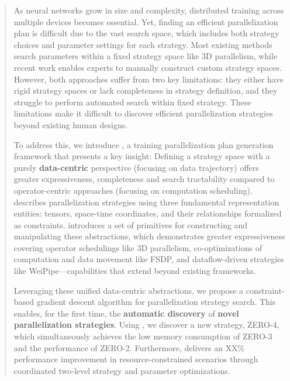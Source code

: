 \begin{abstract}
As neural networks grow in size and complexity, distributed training across multiple devices becomes essential. Yet, finding an efficient parallelization plan is difficult due to the vast search space, which includes both strategy choices and parameter settings for each strategy. Most existing methods search parameters within a fixed strategy space like 3D parallelism, while recent work enables experts to manually construct custom strategy spaces. However, both approaches suffer from two key limitations: they either have rigid strategy spaces or lack completeness in strategy definition, and they struggle to perform automated search within fixed strategy. These limitations make it difficult to discover efficient parallelization strategies beyond existing human designs.


To address this, we introduce \name{}, a training parallelization plan generation framework that presents a key insight: Defining a strategy space with a purely \textbf{data-centric} perspective (focusing on data trajectory) offers greater expressiveness, completeness and search tractability compared to operator-centric approaches (focusing on computation scheduling). \name{} describes parallelization strategies using three fundamental representation entities: tensors, space-time coordinates, and their relationships formalized as constraints. \name{} introduces a set of primitives for constructing and manipulating these abstractions, which demonstrates greater expressiveness covering operator schedulings like 3D parallelism, co-optimizations of computation and data movement like FSDP, and dataflow-driven strategies like WeiPipe—capabilities that extend beyond existing frameworks.


Leveraging these unified data-centric abstractions, we propose a constraint-based gradient descent algorithm for parallelization strategy search. This enables, for the first time, the \textbf{automatic discovery} of \textbf{novel parallelization strategies}. Using \name{}, we discover a new strategy, ZERO-4, which simultaneously achieves the low memory consumption of ZERO-3 and the performance of ZERO-2. Furthermore, \name{} delivers an XX\% performance improvement in resource-constrained scenarios through coordinated two-level strategy and parameter optimizations.
\end{abstract}


